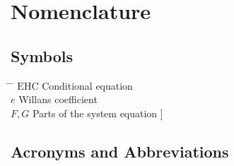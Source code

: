 \chapter*{Nomenclature}

\section*{Symbols}
\begin{tabbing}
 \hspace*{1.6cm} \= \hspace*{8cm} \= \kill
 $\mathrm{EHC}$ \> Conditional equation \> [$-$] \\[0.5ex]
 $e$ \> Willans coefficient \> [$-$] \\[0.5ex]
 $F,G$ \> Parts of the system equation \> [\unitfrac[]{K}{s}]
\end{tabbing}

\section*{Acronyms and Abbreviations}
\begin{acronym}[Bash]
\end{acronym}

